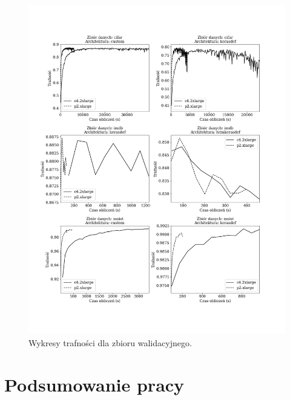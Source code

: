\documentclass[12pt,a4paper,twoside]{article}
\begin{document}
\begin{figure}[h]
  \centering
\includegraphics[scale=0.5]{../obrazy/fig:experiment_acc_val.png}
\caption{Wykresy trafności dla zbioru walidacyjnego.\label{fig:experiment_acc_val}}
\end{figure}

\clearpage

\section{Podsumowanie pracy}

\clearpage
\end{document}

